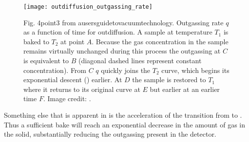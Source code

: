 \begin{figure}
\centering
\texttt{[image: outdiffusion\_outgassing\_rate]}
\caption{Fig. 4point3 from ausersguidetovacuumtechnology.  Outgassing rate $q$ as a function of time for outdiffusion.  A sample
at temperature $T_1$ is baked to $T_2$ at point $A$.  Because the gas concentration in the sample remains virtually unchanged during this
process the outgassing at $C$ is equivalent to $B$ (diagonal dashed lines represent constant concentration).  From $C$ $q$ quickly
joins the $T_2$ curve, which begins its exponential descent () earlier.  At
$D$ the sample is restored to $T_1$ where it returns to its original curve at $E$ but earlier at an earlier time $F$.  Image
credit: .}
\label{fig:electron_lifetime_model_outgassing_sources_diffusion_rate}
\end{figure}

Something else that is apparent in  is the acceleration of the
transition from  to
.  Thus a sufficient bake will reach an exponential decrease in the amount
of gas in the solid, substantially reducing the outgassing present in the detector.

\begin{table}
\centering
{}
\caption{Outgassing rates of \htwoo, , , and  from 316L stainless steel after various treatments.  Significant
reductions from bakeouts can be seen.  Before treatment each samble was subjected to a two-hour degreasing with perchlorethylene vapor at
$125^{\circ}\mathrm{C}$, followed by a one-hour ultrasonic washing at $55^{\circ}\mathrm{C}$, and finally were rinsed with clean water and
dried.  Data is taken from .}
\label{tab:electron_lifetime_model_outgassing_treatment_rates}
\end{table}

